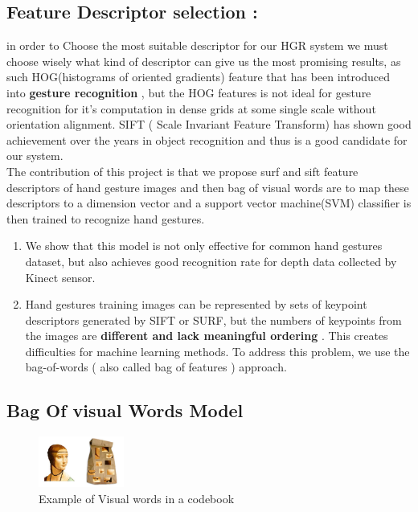 \subsection{Feature Descriptor selection :}
in order to Choose the most suitable descriptor for our HGR system we must choose wisely what kind of descriptor can give us the most promising results, as such  HOG(histograms of oriented gradients) feature that  has been introduced into \textbf{gesture recognition }, but the HOG features is not ideal for gesture recognition for it's computation in dense grids at some single scale without orientation alignment. SIFT ( Scale Invariant Feature Transform) has shown good achievement over the years in object recognition and thus is a good candidate for our system.\\ The contribution of this project is that we propose surf and sift feature descriptors of hand gesture images and then bag of visual words are to map these descriptors to a dimension vector and a  support vector machine(SVM) classifier is then  trained to recognize hand gestures.
\begin{enumerate}
\item We show that this model is not only effective for common hand gestures dataset, but also achieves good  recognition rate for depth data collected by Kinect sensor.
\item Hand gestures training images can be represented by sets of keypoint descriptors generated by SIFT or SURF, but the numbers of keypoints from the images are \textbf{different and lack meaningful ordering }. This creates difficulties for machine learning methods. To address  this problem, we use the bag-of-words ( also called bag of features ) approach.

\end{enumerate}

\subsection{Bag Of visual Words Model}

\begin{figure}
\includegraphics[width=0.25\textwidth]{img/codebook.jpg}
\caption{Example of Visual words in a codebook}
\label{fig:coodbook}
\end{figure}

